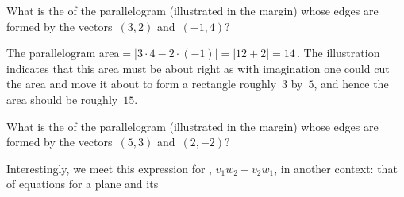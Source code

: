\begin{example} 
What is the  of the parallelogram (illustrated in the margin) whose edges are formed by the vectors~\((3,2)\) and~\((-1,4)\)?
\begin{solution} 
The parallelogram area\({}=|3\cdot4-2\cdot(-1)|=|12+2|=14\)\,.  
The illustration indicates that this area must be about right as with imagination one could cut the area and move it about to form a rectangle roughly~\(3\) by~\(5\), and hence the area should be roughly~\(15\).
\end{solution}
\end{example}



\begin{activity}  
What is the  of the parallelogram (illustrated in the margin) whose edges are formed by the vectors~\((5,3)\) and~\((2,-2)\)?
\end{activity}


Interestingly, we meet this expression for , \(v_1w_2-v_2w_1\), in another context: that of equations for a plane and its 






